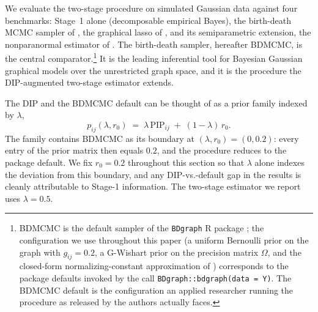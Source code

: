 We evaluate the two-stage procedure on simulated Gaussian data against four benchmarks: Stage~1 alone (decomposable empirical Bayes), the birth-death MCMC sampler of \textcite{mohammadi2015bdgraph}, the graphical lasso of \textcite{friedman2008sparse}, and its semiparametric extension, the nonparanormal estimator of \textcite{liu2009nonparanormal}. The birth-death sampler, hereafter BDMCMC, is the central comparator.\footnote{BDMCMC is the default sampler of the \texttt{BDgraph} R package \parencite{mohammadi2015bdgraph}; the configuration we use throughout this paper (a uniform Bernoulli prior on the graph with $g_{ij} = 0.2$, a G-Wishart prior on the precision matrix $\Omega$, and the closed-form normalizing-constant approximation of \textcite{mohammadi2023accelerating}) corresponds to the package defaults invoked by the call \texttt{BDgraph::bdgraph(data = Y)}. The BDMCMC default is the configuration an applied researcher running the procedure as released by the authors actually faces.} It is the leading inferential tool for Bayesian Gaussian graphical models over the unrestricted graph space, and it is the procedure the DIP-augmented two-stage estimator extends.



The DIP and the BDMCMC default can be thought of as a prior family indexed by $\lambda$,
\[
    p_{ij}(\lambda, r_0) \;=\; \lambda\, \text{PIP}_{ij} \;+\; (1-\lambda)\, r_0.
\]
The family contains BDMCMC as its boundary at $(\lambda, r_0) = (0, 0.2)$: every entry of the prior matrix then equals $0.2$, and the procedure reduces to the package default. We fix $r_0 = 0.2$ throughout this section so that $\lambda$ alone indexes the deviation from this boundary, and any DIP-vs.-default gap in the results is cleanly attributable to Stage-1 information. The two-stage estimator we report uses $\lambda = 0.5$.

